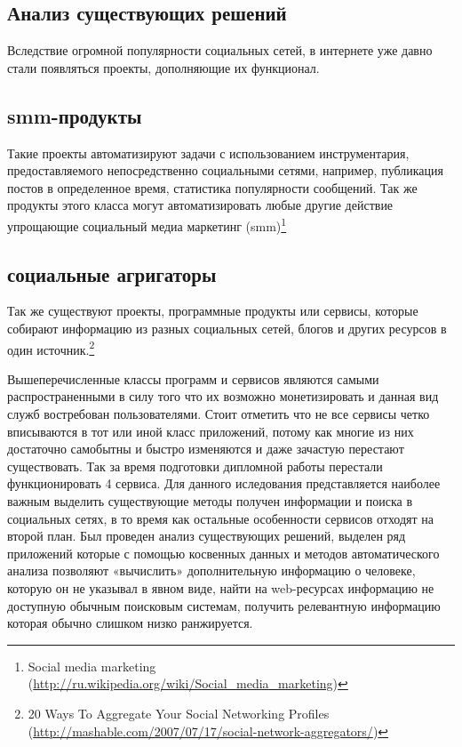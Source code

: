 \begin{chap1}
\section{Анализ существующих решений}
Вследствие огромной популярности социальных сетей, в интернете уже давно стали появляться проекты, дополняющие их функционал. 
\subsection{smm-продукты}
Такие проекты автоматизируют задачи с использованием инструментария, предоставляемого непосредственно социальными сетями, например, публикация постов в определенное время, статистика популярности сообщений. Так же продукты этого класса могут автоматизировать любые другие действие упрощающие социальный медиа маркетинг (smm)\footnote{Social media marketing (\url{http://ru.wikipedia.org/wiki/Social_media_marketing})}
\subsection{социальные агригаторы}
Так же существуют проекты, программные продукты или сервисы, которые собирают информацию из разных социальных сетей, блогов и других ресурсов в один источник.\footnote{20 Ways To Aggregate Your Social Networking Profiles (\url{http://mashable.com/2007/07/17/social-network-aggregators/})} 

Вышеперечисленные классы программ и сервисов являются самыми распространенными в силу того что их возможно монетизировать %
 и данная вид служб востребован пользователями. Стоит отметить что не все сервисы четко вписываются в тот или иной класс приложений, потому как многие из них достаточно самобытны и быстро изменяются и даже зачастую перестают существовать. Так за время подготовки дипломной работы перестали функционировать 4 сервиса. Для данного иследования представляется наиболее важным выделить существующие методы получен информации и поиска в социальных сетях, в то время как остальные особенности сервисов отходят на второй план. Был проведен анализ существующих решений, выделен ряд приложений которые с помощью косвенных данных и методов автоматического анализа позволяют «вычислить» дополнительную информацию о человеке, которую он не указывал в явном виде, найти на web-ресурсах информацию не доступную обычным поисковым системам, получить релевантную информацию которая обычно слишком низко ранжируется. %

\end{chap1}
